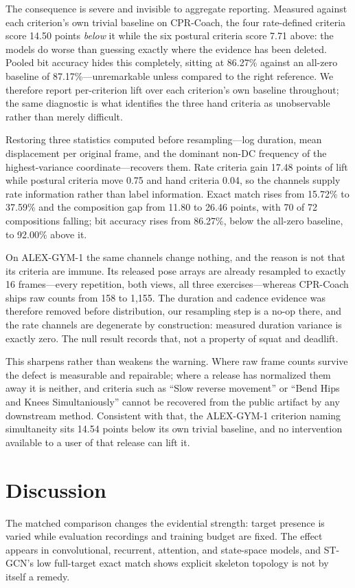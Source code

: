 \documentclass[conference,a4paper]{IEEEtran}
\begin{document}
The consequence is severe and invisible to aggregate reporting. Measured against
each criterion's own trivial baseline on CPR-Coach, the four rate-defined
criteria score 14.50 points \emph{below} it while the six postural criteria
score 7.71 above: the models do worse than guessing exactly where the evidence
has been deleted. Pooled bit accuracy hides this completely, sitting at 86.27\%
against an all-zero baseline of 87.17\%---unremarkable unless compared to the
right reference. We therefore report per-criterion lift over each criterion's
own baseline throughout; the same diagnostic is what identifies the three hand
criteria as unobservable rather than merely difficult.

Restoring three statistics computed before resampling---log duration, mean
displacement per original frame, and the dominant non-DC frequency of the
highest-variance coordinate---recovers them. Rate criteria gain 17.48 points of
lift while postural criteria move 0.75 and hand criteria 0.04, so the
channels supply rate information rather than label information. Exact match rises
from 15.72\% to 37.59\% and the composition gap from 11.80 to 26.46 points, with
70 of 72 compositions falling; bit accuracy rises from 86.27\%, below the
all-zero baseline, to 92.00\% above it.

On ALEX-GYM-1 the same channels change nothing, and the reason is not that its
criteria are immune. Its released pose arrays are already resampled to exactly
16 frames---every repetition, both views, all three exercises---whereas
CPR-Coach ships raw counts from 158 to 1{,}155. The duration and cadence
evidence was therefore removed before distribution, our resampling step is a
no-op there, and the rate channels are degenerate by construction: measured
duration variance is exactly zero. The null result records that, not a property
of squat and deadlift.

This sharpens rather than weakens the warning. Where raw frame counts survive
the defect is measurable and repairable; where a release has normalized them
away it is neither, and criteria such as ``Slow reverse movement'' or ``Bend
Hips and Knees Simultaniously'' cannot be recovered from the public artifact by
any downstream method. Consistent with that, the ALEX-GYM-1 criterion naming
simultaneity sits 14.54 points below its own trivial baseline, and no
intervention available to a user of that release can lift it.

\section{Discussion}
The matched comparison changes the evidential strength: target presence is
varied while evaluation recordings and training budget are fixed. The effect
appears in convolutional, recurrent, attention, and state-space models, and
ST-GCN's low full-target exact match shows explicit skeleton topology is not by
itself a remedy.
\end{document}
